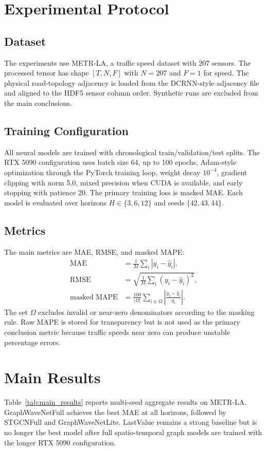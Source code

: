 \documentclass[11pt]{article}
\begin{document}
\section{Experimental Protocol}
\subsection{Dataset}
The experiments use METR-LA, a traffic speed dataset with 207 sensors. The processed tensor has shape $[T,N,F]$ with $N=207$ and $F=1$ for speed. The physical road-topology adjacency is loaded from the DCRNN-style adjacency file and aligned to the HDF5 sensor column order. Synthetic runs are excluded from the main conclusions.

\subsection{Training Configuration}
All neural models are trained with chronological train/validation/test splits. The RTX 5090 configuration uses batch size 64, up to 100 epochs, Adam-style optimization through the PyTorch training loop, weight decay $10^{-4}$, gradient clipping with norm 5.0, mixed precision when CUDA is available, and early stopping with patience 20. The primary training loss is masked MAE. Each model is evaluated over horizons $H\in\{3,6,12\}$ and seeds $\{42,43,44\}$.

\subsection{Metrics}
The main metrics are MAE, RMSE, and masked MAPE:
\begin{align}
  \operatorname{MAE} &= \frac{1}{M}\sum_i |y_i-\hat{y}_i|,\\
  \operatorname{RMSE} &= \sqrt{\frac{1}{M}\sum_i (y_i-\hat{y}_i)^2},\\
  \operatorname{masked\ MAPE} &= \frac{100}{|\Omega|}\sum_{i\in\Omega}\left|\frac{y_i-\hat{y}_i}{y_i}\right|.
\end{align}
The set $\Omega$ excludes invalid or near-zero denominators according to the masking rule. Raw MAPE is stored for transparency but is not used as the primary conclusion metric because traffic speeds near zero can produce unstable percentage errors.

\section{Main Results}
Table~\ref{tab:main_results} reports multi-seed aggregate results on METR-LA. GraphWaveNetFull achieves the best MAE at all horizons, followed by STGCNFull and GraphWaveNetLite. LastValue remains a strong baseline but is no longer the best model after full spatio-temporal graph models are trained with the longer RTX 5090 configuration.
\end{document}
